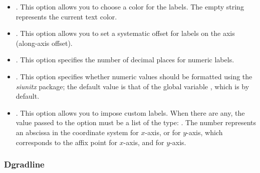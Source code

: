 \begin{itemize}
\begin{itemize}
        \item {}. This option allows you to choose a color for the labels. The empty string represents the current text color.

        \item {}. This option allows you to set a systematic offset for labels on the axis (along-axis offset).

        \item {}. This option specifies the number of decimal places for numeric labels.

        \item {}. This option specifies whether numeric values ​​should be formatted using the \emph{siunitx} package; the default value is that of the global variable , which is \false by default.

        \item {}. This option allows you to impose custom labels. When there are any, the value passed to the option must be a list of the type:  . The number  represents an abscissa in the coordinate system  for $x$-axis, or  for $y$-axis, which corresponds to the affix point  for $x$-axis, and  for $y$-axis.
    \end{itemize}
\end{itemize}

\subsubsection{Dgradline}

